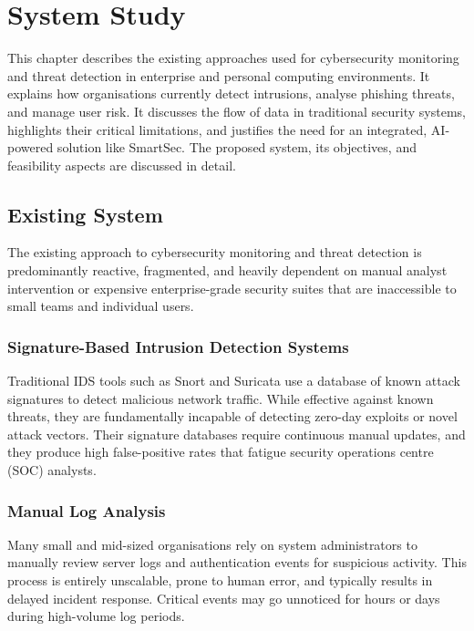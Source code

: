 \chapter{System Study}

This chapter describes the existing approaches used for cybersecurity monitoring and threat detection in enterprise and personal computing environments. It explains how organisations currently detect intrusions, analyse phishing threats, and manage user risk. It discusses the flow of data in traditional security systems, highlights their critical limitations, and justifies the need for an integrated, AI-powered solution like SmartSec. The proposed system, its objectives, and feasibility aspects are discussed in detail.

\section{Existing System}

The existing approach to cybersecurity monitoring and threat detection is predominantly reactive, fragmented, and heavily dependent on manual analyst intervention or expensive enterprise-grade security suites that are inaccessible to small teams and individual users.

\subsection*{Signature-Based Intrusion Detection Systems}

Traditional IDS tools such as Snort and Suricata use a database of known attack signatures to detect malicious network traffic. While effective against known threats, they are fundamentally incapable of detecting zero-day exploits or novel attack vectors. Their signature databases require continuous manual updates, and they produce high false-positive rates that fatigue security operations centre (SOC) analysts.

\subsection*{Manual Log Analysis}

Many small and mid-sized organisations rely on system administrators to manually review server logs and authentication events for suspicious activity. This process is entirely unscalable, prone to human error, and typically results in delayed incident response. Critical events may go unnoticed for hours or days during high-volume log periods.

